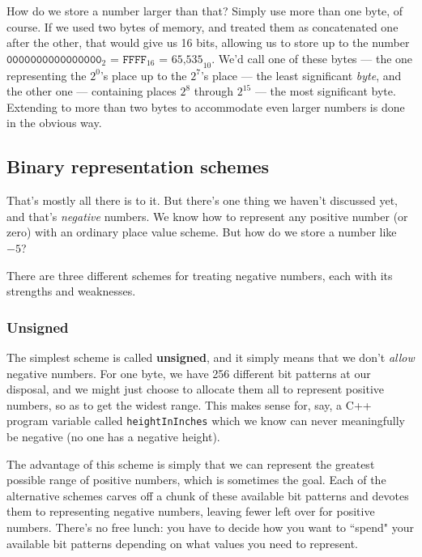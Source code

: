 How do we store a number larger than that? Simply use more than one byte,
of course. If we used two bytes of memory, and treated them as concatenated
one after the other, that would give us 16 bits, allowing us to store up to
the number $\texttt{0000000000000000}_2$ = $\texttt{FFFF}_{16}$ =
$\text{65,535}_{10}$. We'd call one of these bytes --- the one representing
the $2^0$'s place up to the $2^7$'s place --- the least significant
\textit{byte}, and the other one --- containing places $2^8$ through
$2^{15}$ --- the most significant byte. Extending to more than two bytes to
accommodate even larger numbers is done in the obvious way.


\subsection{Binary representation schemes}

That's mostly all there is to it. But there's one thing we haven't
discussed yet, and that's \textit{negative} numbers. We know how to
represent any positive number (or zero) with an ordinary place value
scheme. But how do we store a number like $-5$?

There are three different schemes for treating negative numbers, each with
its strengths and weaknesses.

\subsubsection{Unsigned}

The simplest scheme is called \textbf{unsigned}, and it simply means that
we don't \textit{allow} negative numbers. For one byte, we have 256
different bit patterns at our disposal, and we might just choose to
allocate them all to represent positive numbers, so as to get the widest
range. This makes sense for, say, a C++ program variable called
\texttt{heightInInches} which we know can never meaningfully be negative
(no one has a negative height).

The advantage of this scheme is simply that we can represent the greatest
possible range of positive numbers, which is sometimes the goal. Each of
the alternative schemes carves off a chunk of these available bit patterns
and devotes them to representing negative numbers, leaving fewer left over
for positive numbers. There's no free lunch: you have to decide how you
want to ``spend" your available bit patterns depending on what values you
need to represent.


